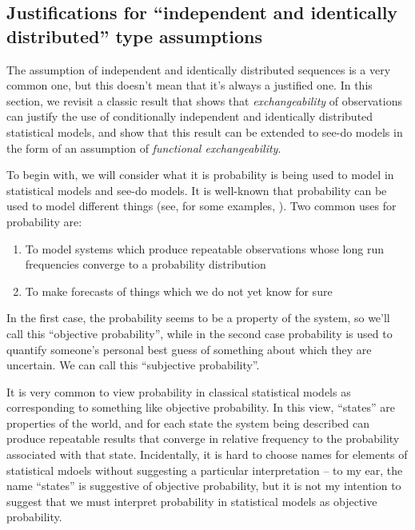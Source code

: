 \subsection{Justifications for ``independent and identically distributed'' type assumptions}

The assumption of independent and identically distributed sequences is a very common one, but this doesn't mean that it's always a justified one. In this section, we revisit a classic result that shows that \emph{exchangeability} of observations can justify the use of conditionally independent and identically distributed statistical models, and show that this result can be extended to see-do models in the form of an assumption of \emph{functional exchangeability}. 

To begin with, we will consider what it is probability is being used to model in statistical models and see-do models. It is well-known that probability can be used to model different things (see, for some examples, \citet{hajek_interpretations_2019}). Two common uses for probability are:

\begin{enumerate}
    \item To model systems which produce repeatable observations whose long run frequencies converge to a probability distribution
    \item To make forecasts of things which we do not yet know for sure
\end{enumerate}

In the first case, the probability seems to be a property of the system, so we'll call this ``objective probability'', while in the second case probability is used to quantify someone's personal best guess of something about which they are uncertain. We can call this ``subjective probability''.

It is very common to view probability in classical statistical models as corresponding to something like objective probability. In this view, ``states'' are properties of the world, and for each state the system being described can produce repeatable results that converge in relative frequency to the probability associated with that state. Incidentally, it is hard to choose names for elements of statistical mdoels without suggesting a particular interpretation -- to my ear, the name ``states'' is suggestive of objective probability, but it is not my intention to suggest that we must interpret probability in statistical models as objective probability.

